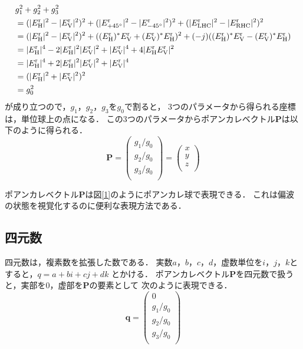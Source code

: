 \documentclass[uplatex,a4paper,10pt]{jsarticle}
\begin{document}
\begin{align*}
    &g_1^2 + g_2^2 + g_3^2 \\
    &= (|E_{\rm{H}}^{\rm{r}}|^2 - |E_{\rm{V}}^{\rm{r}}|^2)^2
      + (|E_{+45^\circ}^{\rm{r}}|^2 - |E_{-45^\circ}^{\rm{r}}|^2)^2
      + (|E_{\mathrm{LHC}}^{\rm{r}}|^2 - |E_{\mathrm{RHC}}^{\rm{r}}|^2)^2\\
    &= (|E_{\rm{H}}^{\rm{r}}|^2 - |E_{\rm{V}}^{\rm{r}}|^2)^2
      + ((E_{\rm{H}}^{\rm{r}})^*E_{\rm{V}}^{\rm{r}} + (E_{\rm{V}}^{\rm{r}})^*E_{\rm{H}}^{\rm{r}})^2
      + (-j)((E_{\rm{H}}^{\rm{r}})^*E_{\rm{V}}^{\rm{r}} - (E_{\rm{V}}^{\rm{r}})^*E_{\rm{H}}^{\rm{r}})\\
    &= |E_{\rm{H}}^{\rm{r}}|^4 - 2|E_{\rm{H}}^{\rm{r}}|^2|E_{\rm{V}}^{\rm{r}}|^2 + |E_{\rm{V}}^{\rm{r}}|^4 + 4|E_{\rm{H}}^{\rm{r}}E_{\rm{V}}^{\rm{r}}|^2\\
    &= |E_{\rm{H}}^{\rm{r}}|^4 + 2|E_{\rm{H}}^{\rm{r}}|^2|E_{\rm{V}}^{\rm{r}}|^2 + |E_{\rm{V}}^{\rm{r}}|^4\\
    &= (|E_{\rm{H}}^{\rm{r}}|^2 + |E_{\rm{V}}^{\rm{r}}|^2)^2\\
    &= g_0^2
\end{align*}
が成り立つので，$g_1$，$g_2$，$g_3$を$g_0$で割ると，
3つのパラメータから得られる座標は，単位球上の点になる．
この3つのパラメータからポアンカレベクトル$\bm{P}$は以下のように得られる．
\begin{equation}
    \bm{P} 
    = \left(
        \begin{array}{c}
            g_1/g_0 \\
            g_2/g_0 \\
            g_3/g_0 \\
        \end{array}
      \right)
    = \left(\begin{array}{c}
            x \\
            y \\
            z \\
        \end{array}
      \right)
\end{equation}

ポアンカレベクトル$\bm{P}$は図\ref{1}のようにポアンカレ球で表現できる．
これは偏波の状態を視覚化するのに便利な表現方法である．


\subsection{四元数}
四元数は，複素数を拡張した数である．
実数$a，b，c，d$，虚数単位を$i，j，k$とすると，$q = a + bi + cj  + dk$
とかける．
ポアンカレベクトル$\bm{P}$を四元数で扱うと，実部を0，虚部を$\bm{P}$の要素として
次のように表現できる．
\begin{equation}
    \bm{q} = \left(\begin{array}{c}
        0\\
        g_1/g_0 \\
        g_2/g_0 \\
        g_3/g_0 \\
    \end{array}
  \right)
\end{equation}
\end{document}
